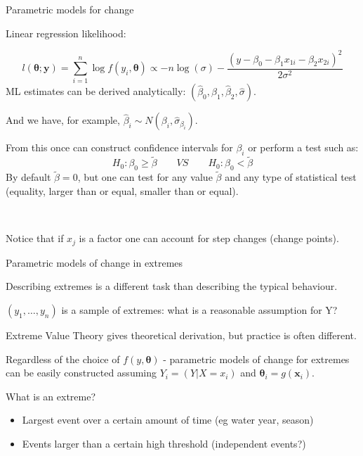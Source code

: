 \documentclass[
  10pt,
  ignorenonframetext,
  compress]{beamer}
\providecommand{\tightlist}{%
  \setlength{\itemsep}{0pt}\setlength{\parskip}{0pt}}
\begin{document}
\begin{frame}{Parametric models for change}
\protect\hypertarget{parametric-models-for-change-1}{}

Linear regression likelihood:

\[l(\boldsymbol{\theta}; \boldsymbol{y}) = \sum_{i=1}^{n} \log f(y_i, \boldsymbol{\theta}) \propto - n \log(\sigma) - \frac{(y-\beta _0 - \beta_1 x_{1i} - \beta_2 x_{2i})^2}{2 \sigma^2} \]
ML estimates can be derived analytically:
\((\hat{\beta}_0, \hat{\beta}_1,\hat{\beta}_2,\hat{\sigma})\).

And we have, for example,
\(\hat{\beta}_i \sim N(\beta_i, \hat{\sigma}_{\beta_i})\).

From this once can construct confidence intervals for \(\beta_i\) or
perform a test such as:
\[H_0: \beta_0 \geq \tilde{\beta} \quad \quad VS  \quad \quad H_0: \beta_0 < \tilde{\beta}\]
By default \(\tilde{\beta} = 0\), but one can test for any value
\(\tilde{\beta}\) and any type of statistical test (equality, larger
than or equal, smaller than or equal).

~

Notice that if \(x_j\) is a factor one can account for step changes
(change points).

\end{frame}

\begin{frame}{Parametric models of change in extremes}
\protect\hypertarget{parametric-models-of-change-in-extremes}{}

Describing extremes is a different task than describing the typical
behaviour.

\((y_1, \ldots, y_n)\) is a sample of extremes: what is a reasonable
assumption for Y?

Extreme Value Theory gives theoretical derivation, but practice is often
different.

Regardless of the choice of \(f(y, \boldsymbol{\theta})\) - parametric
models of change for extremes can be easily constructed assuming
\(Y_i=(Y|X=x_i)\) and \(\boldsymbol{\theta}_i = g(\boldsymbol{x}_i)\).

\pause

What is an extreme?

\begin{itemize}
\tightlist
\item
  Largest event over a certain amount of time (eg water year, season)
\item
  Events larger than a certain high threshold (independent events?)
\end{itemize}

\end{frame}
\end{document}
